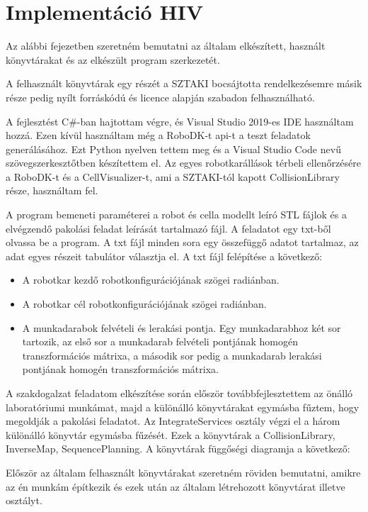 \chapter{Implementáció HIV}
Az alábbi fejezetben szeretném bemutatni az általam elkészített, használt könyvtárakat és az elkészült program szerkezetét. 

A felhasznált könyvtárak egy részét a SZTAKI bocsájtotta rendelkezésemre másik része pedig nyílt forráskódú és licence alapján szabadon felhasználható. 

A fejlesztést C\#-ban hajtottam végre, és Visual Studio 2019-es IDE használtam hozzá. Ezen kívül használtam még a RoboDK-t api-t a teszt feladatok generálásához. Ezt Python nyelven tettem meg és a Visual Studio Code nevű szövegszerkesztőtben készítettem el. Az egyes robotkarállások térbeli ellenőrzésére a RoboDK-t és a CellVisualizer-t, ami a SZTAKI-tól kapott CollisionLibrary része, használtam fel.

A program bemeneti paraméterei a robot és cella modellt leíró STL fájlok és a elvégzendő pakolási feladat leírását tartalmazó fájl. A feladatot egy txt-ből olvassa be a program. A txt fájl minden sora egy összefüggő adatot tartalmaz, az adat egyes részeit tabulátor választja el. A txt fájl felépítése a következő:

\begin{itemize}
\item A robotkar kezdő robotkonfigurációjának szögei radiánban.
\item A robotkar cél robotkonfigurációjának szögei radiánban. 
\item A munkadarabok felvételi és lerakási pontja. Egy munkadarabhoz két sor tartozik, az első sor a munkadarab felvételi pontjának homogén transzformációs mátrixa, a második sor pedig a munkadarab lerakási pontjának homogén transzformációs mátrixa. 

\end{itemize}  

A szakdogalzat feladatom elkészítése során először továbbfejlesztettem az önálló laboratóriumi munkámat, majd a különálló könyvtárakat egymásba fűztem, hogy megoldják a pakolási feladatot. Az IntegrateServices osztály végzi el a három különálló könyvtár egymásba fűzését. Ezek a könyvtárak a CollisionLibrary, InverseMap, SequencePlanning. A könyvtárak függőségi diagramja a következő:

Először az általam felhasznált könyvtárakat szeretném röviden bemutatni, amikre az én munkám építkezik és ezek után az általam létrehozott könyvtárat illetve osztályt.

